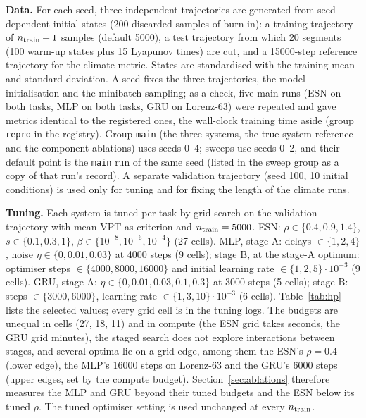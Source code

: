 \textbf{Data.} For each seed, three independent trajectories are generated from seed-dependent initial states (200 discarded samples of burn-in): a training trajectory of $n_{\rm train}+1$ samples (default 5000), a test trajectory from which 20 segments (100 warm-up states plus 15 Lyapunov times) are cut, and a 15000-step reference trajectory for the climate metric. States are standardised with the training mean and standard deviation. A seed fixes the three trajectories, the model initialisation and the minibatch sampling; as a check, five main runs (ESN on both tasks, MLP on both tasks, GRU on Lorenz-63) were repeated and gave metrics identical to the registered ones, the wall-clock training time aside (group \texttt{repro} in the registry). Group \texttt{main} (the three systems, the true-system reference and the component ablations) uses seeds 0--4; sweeps use seeds 0--2, and their default point is the \texttt{main} run of the same seed (listed in the sweep group as a copy of that run's record). A separate validation trajectory (seed 100, 10 initial conditions) is used only for tuning and for fixing the length of the climate runs.

\textbf{Tuning.} Each system is tuned per task by grid search on the validation trajectory with mean VPT as criterion and $n_{\rm train}=5000$. ESN: $\rho\in\{0.4,0.9,1.4\}$, $s\in\{0.1,0.3,1\}$, $\beta\in\{10^{-8},10^{-6},10^{-4}\}$ (27 cells). MLP, stage A: delays $\in\{1,2,4\}$, noise $\eta\in\{0,0.01,0.03\}$ at 4000 steps (9 cells); stage B, at the stage-A optimum: optimiser steps $\in\{4000,8000,16000\}$ and initial learning rate $\in\{1,2,5\}\cdot10^{-3}$ (9 cells). GRU, stage A: $\eta\in\{0,0.01,0.03,0.1,0.3\}$ at 3000 steps (5 cells); stage B: steps $\in\{3000,6000\}$, learning rate $\in\{1,3,10\}\cdot10^{-3}$ (6 cells). Table~\ref{tab:hp} lists the selected values; every grid cell is in the tuning logs. The budgets are unequal in cells (27, 18, 11) and in compute (the ESN grid takes seconds, the GRU grid minutes), the staged search does not explore interactions between stages, and several optima lie on a grid edge, among them the ESN's $\rho=0.4$ (lower edge), the MLP's 16000 steps on Lorenz-63 and the GRU's 6000 steps (upper edges, set by the compute budget). Section~\ref{sec:ablations} therefore measures the MLP and GRU beyond their tuned budgets and the ESN below its tuned $\rho$. The tuned optimiser setting is used unchanged at every $n_{\rm train}$.

